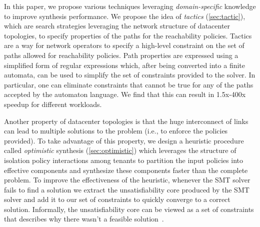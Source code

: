 In this paper, we propose various techniques leveraging
\emph{domain-specific} knowledge to improve synthesis performance. We
propose the idea of \emph{tactics} (\cref{sec:tactic}), which are
search strategies leveraging the network structure of datacenter
topologies, to specify properties of the paths for the reachability
policies.  Tactics are a way for network operators to specify a
high-level constraint on the set of paths allowed for reachability
policies.  Path properties are expressed using a simplified form of
regular expressions which, after being converted into a finite
automata, can be used to simplify the set of constraints provided to
the solver.  In particular, one can eliminate constraints that cannot
be true for any of the paths accepted by the automaton language. We
find that this can result in 1.5x-400x speedup for different workloads.


Another property of datacenter topologies is that the huge
interconnect of links can lead to multiple solutions to the problem
(i.e., to enforce the policies provided).  To take advantage of this
property, we design a heuristic procedure called \emph{optimistic}
synthesis (\cref{sec:optimistic}) which leverages the structure of
isolation policy interactions among tenants to partition the input
policies into effective components and synthesize these components
faster than the complete problem. To improve the effectiveness of the
heuristic, whenever the SMT solver fails to find a solution we extract
the unsatisfiability core produced by the SMT solver and 
add it to our set of constraints to quickly converge to a correct solution.
Informally, the unsatisfiability core can be viewed
as a set of constraints that describes why there wasn't a feasible solution~\cite{}. 

